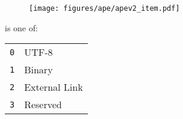 \begin{figure}[h]
  \texttt{[image: figures/ape/apev2\_item.pdf]}
\end{figure}
 is one of:
\begin{table}[h]
  \begin{tabular}{rl}
    \texttt{0} & UTF-8 \\
    \texttt{1} & Binary \\
    \texttt{2} & External Link \\
    \texttt{3} & Reserved \\
  \end{tabular}
\end{table}


